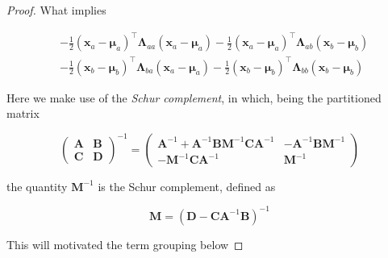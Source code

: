 \begin{appendices}
\begin{proof}
    What implies

    \begin{equation}
    \begin{aligned} &-\frac{1}{2}\left(\mathbf{x}_{a}-\boldsymbol{\mu}_{a}\right)^\top \boldsymbol{\Lambda}_{a a}\left(\mathbf{x}_{a}-\boldsymbol{\mu}_{a}\right)-\frac{1}{2}\left(\mathbf{x}_{a}-\boldsymbol{\mu}_{a}\right)^\top \boldsymbol{\Lambda}_{a b}\left(\mathbf{x}_{b}-\boldsymbol{\mu}_{b}\right) \\ &-\frac{1}{2}\left(\mathbf{x}_{b}-\boldsymbol{\mu}_{b}\right)^\top \boldsymbol{\Lambda}_{b a}\left(\mathbf{x}_{a}-\boldsymbol{\mu}_{a}\right)-\frac{1}{2}\left(\mathbf{x}_{b}-\boldsymbol{\mu}_{b}\right)^\top \boldsymbol{\Lambda}_{b b}\left(\mathbf{x}_{b}-\boldsymbol{\mu}_{b}\right) 
    \end{aligned}
    \end{equation}

    Here we make use of the \textit{Schur complement}, in which, being the partitioned matrix

    \begin{equation}
    \left(\begin{array}{cc}{\mathbf{A}} & {\mathbf{B}} \\ {\mathbf{C}} & {\mathbf{D}}\end{array}\right)^{-1}=\left(\begin{array}{cc}{\mathbf{A}^{-1}+\mathbf{A}^{-1} \mathbf{B} \mathbf{M}^{-1} \mathbf{C} \mathbf{A}^{-1}} & {-\mathbf{A}^{-1} \mathbf{B} \mathbf{M}^{-1}} \\ {-\mathbf{M}^{-1} \mathbf{C} \mathbf{A}^{-1}} & {\mathbf{M}^{-1}}\end{array}\right)
    \end{equation}

    the quantity $\mathbf{M}^{-1}$ is the Schur complement, defined as 

    \begin{equation}
      \label{eq:app-par-gau-schur}
      \mathbf{M}=\left(\mathbf{D}-\mathbf{C A}^{-1} \mathbf{B}\right)^{-1}  
    \end{equation}

    This will motivated the term grouping below


\end{proof}
\end{appendices}
